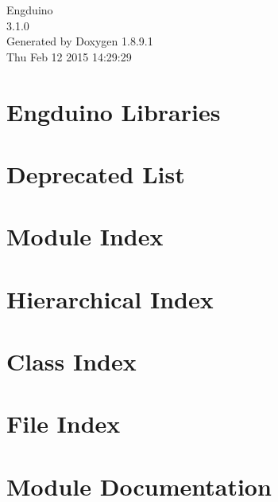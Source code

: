 \documentclass[twoside]{book}
\newcommand{\+}{\discretionary{\mbox{\scriptsize$\hookleftarrow$}}{}{}}
\newcommand{\clearemptydoublepage}{%
  \newpage{\pagestyle{empty}\cleardoublepage}%
}
\begin{document}
\hypersetup{pageanchor=false,
             bookmarks=true,
             bookmarksnumbered=true,
             pdfencoding=unicode
            }
\begin{titlepage}
\vspace*{7cm}
\begin{center}%
{\Large Engduino \\[1ex]\large 3.\+1.\+0 }\\
\vspace*{1cm}
{\large Generated by Doxygen 1.8.9.1}\\
\vspace*{0.5cm}
{\small Thu Feb 12 2015 14:29:29}\\
\end{center}
\end{titlepage}
\clearemptydoublepage
\tableofcontents
\clearemptydoublepage
{}
\hypersetup{pageanchor=true}

\chapter{Engduino Libraries}
\label{index}\hypertarget{index}{}
\chapter{Deprecated List}
\label{deprecated}
\hypertarget{deprecated}{}

\chapter{Module Index}

\chapter{Hierarchical Index}

\chapter{Class Index}

\chapter{File Index}

\chapter{Module Documentation}









\end{document}
